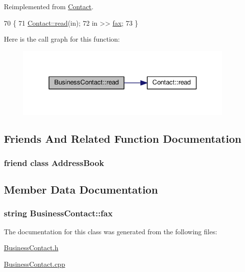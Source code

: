 Reimplemented from \hyperlink{classContact_a129d7132ff55adf52737ca7e364d6420}{Contact}.


\begin{DoxyCode}
70 \{
71    \hyperlink{classContact_a129d7132ff55adf52737ca7e364d6420}{Contact::read}(in);
72    in >> \hyperlink{classBusinessContact_aacd4a6593b7bfdb066ad53af1a6ec94f}{fax};
73 \}
\end{DoxyCode}


Here is the call graph for this function\+:
\nopagebreak
\begin{figure}[H]
\begin{center}
\leavevmode
\includegraphics[width=308pt]{classBusinessContact_abd412623d1dea64c01ec28a42067dbbc_cgraph}
\end{center}
\end{figure}




\subsection{Friends And Related Function Documentation}
\subsubsection[{\texorpdfstring{Address\+Book}{AddressBook}}]{\setlength{\rightskip}{0pt plus 5cm}friend class {\bf Address\+Book}\hspace{0.3cm}{\ttfamily [friend]}}\hypertarget{classBusinessContact_a196c2536dfbd98b40c60736c4ca095d2}{}\label{classBusinessContact_a196c2536dfbd98b40c60736c4ca095d2}


\subsection{Member Data Documentation}
\subsubsection[{\texorpdfstring{fax}{fax}}]{\setlength{\rightskip}{0pt plus 5cm}string Business\+Contact\+::fax\hspace{0.3cm}{\ttfamily [protected]}}\hypertarget{classBusinessContact_aacd4a6593b7bfdb066ad53af1a6ec94f}{}\label{classBusinessContact_aacd4a6593b7bfdb066ad53af1a6ec94f}


The documentation for this class was generated from the following files\+:\begin{DoxyCompactItemize}
\item 
\hyperlink{BusinessContact_8h}{Business\+Contact.\+h}\item 
\hyperlink{BusinessContact_8cpp}{Business\+Contact.\+cpp}\end{DoxyCompactItemize}
